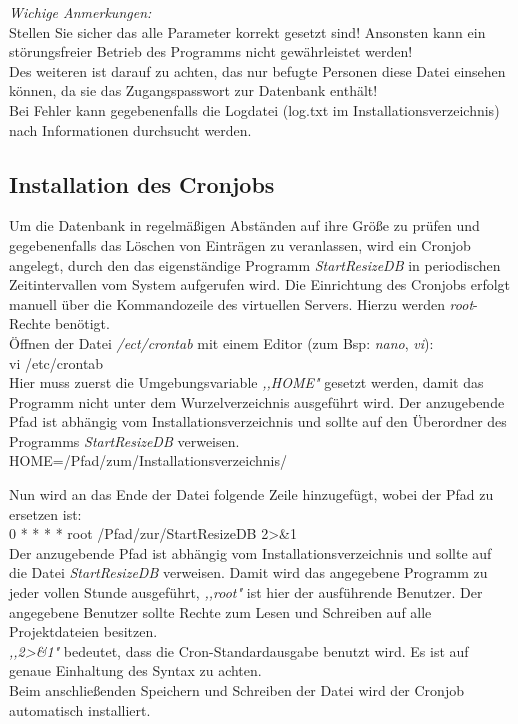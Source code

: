 \documentclass[fontsize = 12pt, paper = a4]{scrreprt}
\begin{document}
\textit{Wichige Anmerkungen:}\\
Stellen Sie sicher das alle Parameter korrekt gesetzt sind! Ansonsten kann ein störungsfreier Betrieb des Programms nicht gewährleistet werden!\\
Des weiteren ist darauf zu achten, das nur befugte Personen diese Datei einsehen können, da sie das Zugangspasswort zur Datenbank enthält!\\
Bei Fehler kann gegebenenfalls die Logdatei (log.txt im Installationsverzeichnis) nach Informationen durchsucht werden.

\subsection{Installation des Cronjobs}

Um die Datenbank in regelmäßigen Abständen auf ihre Größe zu prüfen und gegebenenfalls das Löschen von Einträgen zu veranlassen, wird ein Cronjob angelegt, durch den das eigenständige Programm \textit{StartResizeDB} in periodischen Zeitintervallen vom System aufgerufen wird.
Die Einrichtung des Cronjobs erfolgt manuell über die Kommandozeile des virtuellen Servers. Hierzu werden \textit{root}-Rechte benötigt.\\

Öffnen der Datei \textit{/ect/crontab} mit einem Editor (zum Bsp: \textit{nano}, \textit{vi}):\\

  vi /etc/crontab    \\

Hier muss zuerst die Umgebungsvariable \textit{,,HOME"} gesetzt werden, damit das Programm nicht unter dem Wurzelverzeichnis ausgeführt wird. Der anzugebende Pfad ist abhängig vom Installationsverzeichnis und sollte auf den Überordner des Programms \textit{StartResizeDB} verweisen.\\
 
  HOME=/Pfad/zum/Installationsverzeichnis/

Nun wird an das Ende der Datei folgende Zeile hinzugefügt, wobei der Pfad zu ersetzen ist:\\

  0 * * * * root /Pfad/zur/StartResizeDB 2\textgreater\&1 \\

Der anzugebende Pfad ist abhängig vom Installationsverzeichnis und sollte auf die Datei \textit{StartResizeDB} verweisen.
Damit wird das angegebene Programm zu jeder vollen Stunde ausgeführt, \textit{,,root"} ist hier der ausführende Benutzer. Der angegebene Benutzer sollte Rechte zum Lesen und Schreiben auf alle Projektdateien besitzen.\\
\textit{,,2\textgreater\&1"} bedeutet, dass die Cron-Standardausgabe benutzt wird.
Es ist auf genaue Einhaltung des Syntax zu achten.\\
Beim anschließenden Speichern und Schreiben der Datei wird der Cronjob automatisch installiert.
\end{document}
